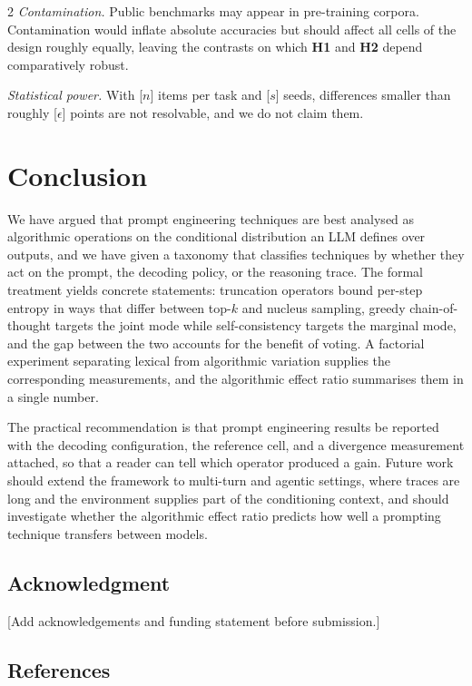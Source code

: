 \documentclass{article}
\begin{document}
\begin{multicols}{2}
\textit{Contamination.} Public benchmarks may appear in pre-training corpora. Contamination would inflate absolute accuracies but should affect all cells of the design roughly equally, leaving the contrasts on which \textbf{H1} and \textbf{H2} depend comparatively robust.

\textit{Statistical power.} With \textcolor{BrickRed}{[$n$]} items per task and \textcolor{BrickRed}{[$s$]} seeds, differences smaller than roughly \textcolor{BrickRed}{[$\epsilon$]} points are not resolvable, and we do not claim them.

\section{Conclusion}

We have argued that prompt engineering techniques are best analysed as algorithmic operations on the conditional distribution an LLM defines over outputs, and we have given a taxonomy that classifies techniques by whether they act on the prompt, the decoding policy, or the reasoning trace. The formal treatment yields concrete statements: truncation operators bound per-step entropy in ways that differ between top-$k$ and nucleus sampling, greedy chain-of-thought targets the joint mode while self-consistency targets the marginal mode, and the gap between the two accounts for the benefit of voting. A factorial experiment separating lexical from algorithmic variation supplies the corresponding measurements, and the algorithmic effect ratio summarises them in a single number.

The practical recommendation is that prompt engineering results be reported with the decoding configuration, the reference cell, and a divergence measurement attached, so that a reader can tell which operator produced a gain. Future work should extend the framework to multi-turn and agentic settings, where traces are long and the environment supplies part of the conditioning context, and should investigate whether the algorithmic effect ratio predicts how well a prompting technique transfers between models.

\subsection*{Acknowledgment}

\textcolor{BrickRed}{[Add acknowledgements and funding statement before submission.]}

\subsection*{References}


\end{multicols}
\end{document}
